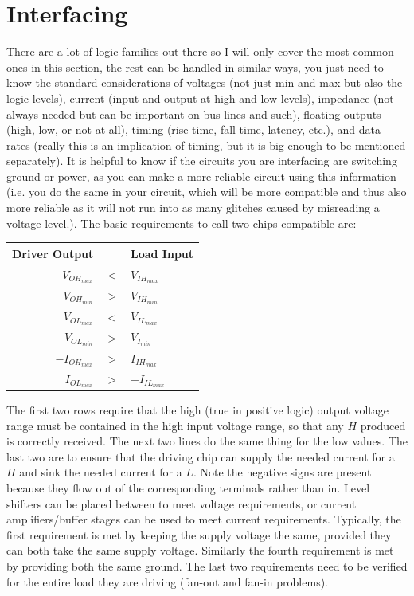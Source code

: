 \section{Interfacing}

There are a lot of logic families out there so I will only cover the most common ones in this section, the rest can be handled in similar ways, you just need to know the standard considerations of voltages (not just min and max but also the logic levels), current (input and output at high and low levels), impedance (not always needed but can be important on bus lines and such), floating outputs (high, low, or not at all), timing (rise time, fall time, latency, etc.), and data rates (really this is an implication of timing, but it is big enough to be mentioned separately).  It is helpful to know if the circuits you are interfacing are switching ground or power, as you can make a more reliable circuit using this information (i.e. you do the same in your circuit, which will be more compatible and thus also more reliable as it will not run into as many glitches caused by misreading a voltage level.).  The basic requirements to call two chips compatible are:

\begin{tabular}{rcl}
Driver Output  && Load Input \\\hline
$V_{OH_{max}}$ & $<$ & $V_{IH_{max}}$\\
$V_{OH_{min}}$ & $>$ & $V_{IH_{min}}$\\
$V_{OL_{max}}$ & $<$ & $V_{IL_{max}}$\\
$V_{OL_{min}}$ & $>$ & $V_{I_{min}}$\\
$-I_{OH_{max}}$ & $>$ & $I_{IH_{max}}$\\
$I_{OL_{max}}$ & $>$ & $-I_{IL_{max}}$\\
\end{tabular}

The first two rows require that the high (true in positive logic) output voltage range must be contained in the high input voltage range, so that any $H$ produced is correctly received.  The next two lines do the same thing for the low values.  The last two are to ensure that the driving chip can supply the needed current for a $H$ and sink the needed current for a $L$.  Note the negative signs are present because they flow out of the corresponding terminals rather than in.  Level shifters can be placed between to meet voltage requirements, or current amplifiers/buffer stages can be used to meet current requirements.  Typically, the first requirement is met by keeping the supply voltage the same, provided they can both take the same supply voltage.  Similarly the fourth requirement is met by providing both the same ground.  The last two requirements need to be verified for the entire load they are driving (fan-out and fan-in problems).

